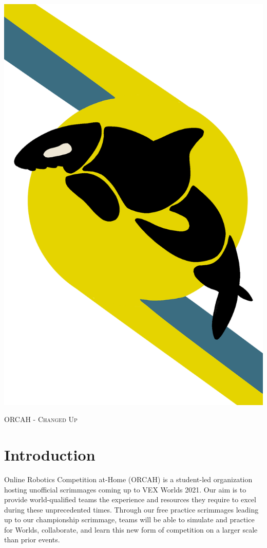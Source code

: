 \documentclass[letterpaper, 12pt]{article}
\begin{document}
\begin{titlepage}
\begin{center}
\includegraphics[scale=0.35]{title}

\vspace{0.5in}

\textsc{\huge{ORCAH - Changed Up}}

\end{center}
\end{titlepage}

\section{Introduction}

Online Robotics Competition at-Home (ORCAH) is a student-led organization hosting unofficial scrimmages coming up to VEX Worlds 2021.  Our aim is to provide world-qualified teams the experience and resources they require to excel during these unprecedented times.  Through our free practice scrimmages leading up to our championship scrimmage, teams will be able to simulate and practice for Worlds, collaborate, and learn this new form of competition on a larger scale than prior events.
\end{document}
